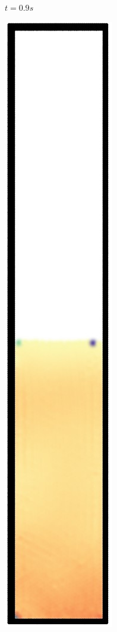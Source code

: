 \begin{figure}[h]
\begin{subfigure}[t]{0.09\textwidth}
    \caption{\small{$t=0.9s$}}
  \end{subfigure}%
  \begin{subfigure}[t]{0.09\textwidth}
    \includegraphics[width=\textwidth]{images/oscillate/100.jpg}

\end{subfigure}
\end{figure}
